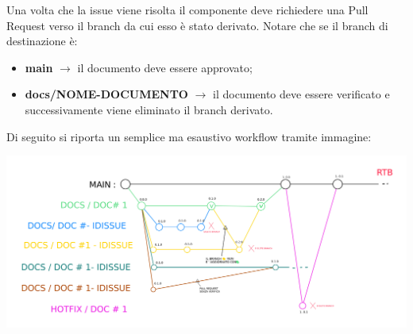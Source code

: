          
        Una volta che la issue viene risolta il componente deve richiedere una Pull Request
        verso il branch da cui esso è stato derivato.
        Notare che se il branch di destinazione è:
        \begin{itemize}
            \item \textbf{main} $\rightarrow$ il documento deve essere approvato;
            \item \textbf{docs/NOME-DOCUMENTO} $\rightarrow$ il documento deve essere verificato e successivamente viene eliminato il branch derivato.
        \end{itemize}

        Di seguito si riporta un semplice ma esaustivo workflow tramite immagine:
        \begin{center}
            \includegraphics[scale = 0.07]{template/images/workflow.jpg}
        \end{center}

